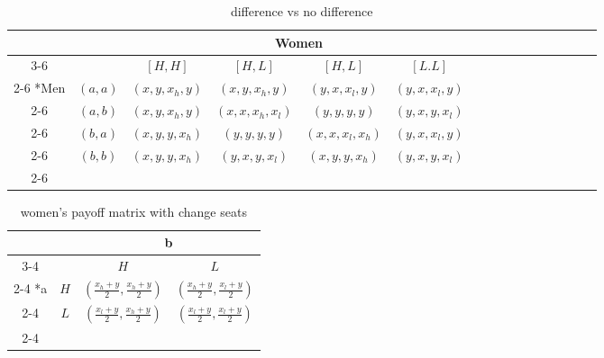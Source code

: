 \documentclass{article}
\begin{document}
	\begin{table}[h]
		\begin{center}
                \setlength{\extrarowheight}{2pt}
                \begin{tabular}{*{16}{c|}}
                  \multicolumn{2}{c}{} & \multicolumn{1}{c}{} & \multicolumn{2}{c}{Women}\\\cline{3-6}
                  \multicolumn{1}{c}{} &  & $[H, H]$  & $[H, L]$ & $[H, L]$ & $[L.L]$\\\cline{2-6}
                  \multirow{4}*{Men}  & $(a,a)$ & $(x,y,x_h,y)$ & $(x,y,x_h,y)$ & $(y,x,x_l,y)$ & $(y,x,x_l,y)$\\\cline{2-6}
                  & $(a,b)$ & $(x,y,x_h,y)$ & $(x,x,x_h,x_l)$ & $(y,y,y,y)$ & $(y,x,y,x_l)$\\\cline{2-6}
                  & $(b,a)$ & $(x,y,y,x_h)$ & $(y,y,y,y)$ & $(x,x,x_l,x_h)$ & $(y,x,x_l,y)$\\\cline{2-6}
                  & $(b,b)$ & $(x,y,y,x_h)$ & $(y,x,y,x_l)$ & $(x,y,y,x_h)$ & $(y,x,y,x_l)$\\\cline{2-6}
                \end{tabular}
                \end{center}
                \caption{difference vs no difference}
          \end{table}

	\begin{table}[h]
		\begin{center}
		\begingroup
                \renewcommand{\arraystretch}{1.5}
                \setlength{\extrarowheight}{2pt}
                \begin{tabular}{*{4}{c|}}
                  \multicolumn{2}{c}{} & \multicolumn{2}{c}{b}\\\cline{3-4}
                  \multicolumn{1}{c}{} &  & $H$  & $L$ \\\cline{2-4}
                  \multirow{2}*{a}  & $H$ & $(\frac{x_h+y}{2}, \frac{x_h+y}{2})$ & $(\frac{x_h+y}{2}, \frac{x_l+y}{2})$ \\\cline{2-4}
                  & $L$ & $(\frac{x_l+y}{2}, \frac{x_h+y}{2})$ & $(\frac{x_l+y}{2}, \frac{x_l+y}{2})$ \\\cline{2-4}
                \end{tabular}
                \endgroup
                \end{center}
                \caption{women's payoff matrix with change seats}
  	\end{table}
	
\end{document}
